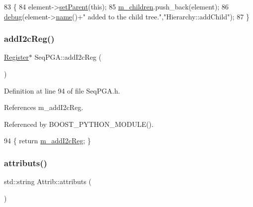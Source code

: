\begin{DoxyCode}
83                                           \{
84   element->\hyperlink{classHierarchy_a585ad1aeec16077a0e532ab8b4fc557b}{setParent}(\textcolor{keyword}{this});
85   \hyperlink{classHierarchy_a038816763941fd4a930504917f60483b}{m\_children}.push\_back(element);
86   \hyperlink{classObject_aac010553f022165573714b7014a15f0d}{debug}(element->\hyperlink{classObject_a300f4c05dd468c7bb8b3c968868443c1}{name}()+\textcolor{stringliteral}{" added to the child tree."},\textcolor{stringliteral}{"Hierarchy::addChild"});
87 \}
\end{DoxyCode}
\mbox{\label{classSeqPGA_a80eec67d433c12f8fcdf1ad73c6b8f59}} 
\subsubsection{\texorpdfstring{add\+I2c\+Reg()}{addI2cReg()}}
{\footnotesize\ttfamily \hyperlink{classRegister}{Register}$\ast$ Seq\+P\+G\+A\+::add\+I2c\+Reg (\begin{DoxyParamCaption}{ }\end{DoxyParamCaption})\hspace{0.3cm}{\ttfamily [inline]}}



Definition at line 94 of file Seq\+P\+G\+A.\+h.



References m\+\_\+add\+I2c\+Reg.



Referenced by B\+O\+O\+S\+T\+\_\+\+P\+Y\+T\+H\+O\+N\+\_\+\+M\+O\+D\+U\+L\+E().


\begin{DoxyCode}
94 \{ \textcolor{keywordflow}{return} \hyperlink{classSeqPGA_ac3a6aad3fec65ceb78528b6d20deeb3f}{m\_addI2cReg};    \}
\end{DoxyCode}
\mbox{\label{classAttrib_aee7bbf16b144887f196e1341b24f8a26}} 
\subsubsection{\texorpdfstring{attributs()}{attributs()}}
{\footnotesize\ttfamily std\+::string Attrib\+::attributs (\begin{DoxyParamCaption}{ }\end{DoxyParamCaption})\hspace{0.3cm}{\ttfamily [inherited]}}

